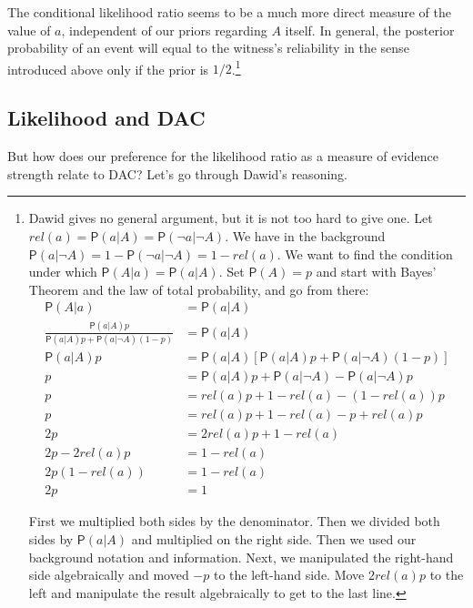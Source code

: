 \documentclass[10pt,dvipsnames,enabledeprecatedfontcommands]{scrartcl}
\newcommand{\n}{\neg}
\newcommand{\pr}[1]{\mathsf{P}(#1)}
\begin{document}
The conditional likelihood ratio seems to be a much more direct measure
of the value of \(a\), independent of our priors regarding \(A\) itself.
In general, the posterior probability of an event will equal to the
witness's reliability in the sense introduced above only if the prior is
\(1/2\).\footnote{Dawid gives no general argument, but it is not too hard to  give one. Let $rel(a)=\pr{a\vert A}=\pr{\n a\vert \n A}$. We have in the background $\pr{a\vert \n A}=1-\pr{\n a\vert \n A}=1-rel(a)$.
 We want to find the condition under which $\pr{A\vert a} = \pr{a\vert A}$. Set $\pr{A}=p$ and  start with Bayes' Theorem and the law of total probability, and go from there:
 \begin{align*}
 \pr{A\vert a}& = \pr{a\vert A}\\
 \frac{\pr{a\vert A}p}{\pr{a\vert A}p+\pr{a\vert \n A}(1-p)} &= \pr{a\vert A} \\
 \pr{a\vert A}p & = \pr{a\vert A}[\pr{a\vert A}p+\pr{a\vert \n A}(1-p)]\\
 p & = \pr{a\vert A}p + \pr{a\vert \n A} - \pr{a\vert \n A}p\\
 p &= rel(a) p + 1-rel(a)- (1-rel(a))p\\
 p & = rel(a)p +1 - rel(a) -p +rel(a)p \\
 2p & =  2rel(a)p + 1 - rel(a)  \\
 2p - 2 rel(a)p & = 1-rel(a)\\
 2p(1-rel(a)) &= 1-rel(a)\\
 2p & = 1
 \end{align*}

\noindent  First we multiplied both sides by the denominator. Then we divided both sides by $\pr{a\vert A}$ and multiplied on the right side. Then we used our background notation and information. Next, we manipulated the right-hand side algebraically and  moved  $-p$ to the left-hand side. Move $2rel(a)p$ to the left and manipulate the result algebraically to get to the last line.}

\hypertarget{likelihood-and-dac}{%
\subsection{Likelihood and DAC}\label{likelihood-and-dac}}

But how does our preference for the likelihood ratio as a measure of
evidence strength relate to DAC? Let's go through Dawid's reasoning.
\end{document}
